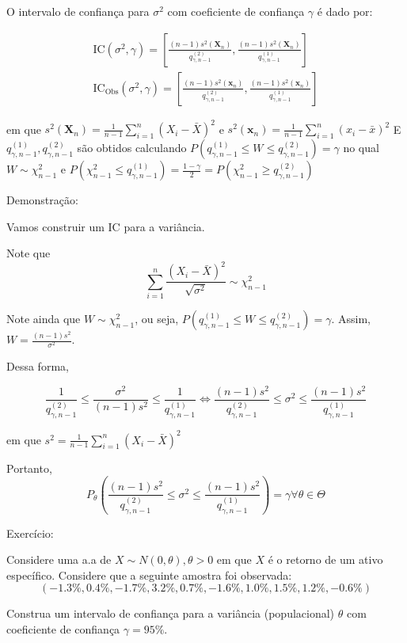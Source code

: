 \documentclass[
  letterpaper,
  DIV=11,
  numbers=noendperiod]{scrreprt}
\begin{document}
O intervalo de confiança para \(\sigma^2\) com coeficiente de confiança
\(\gamma\) é dado por:

\[
\begin{aligned}
\mathrm{IC} (\sigma^2, \gamma) = \left [\frac{(n-1)s^2(\pmb{X}_{n})}{q^{(2)}_{\gamma, n-1}},
\frac{(n-1)s^2(\pmb{X}_{n})}{q^{(1)}_{\gamma, n-1}}\right] \\
\mathrm{IC}_{\mathrm{Obs}} (\sigma^2, \gamma) = \left [\frac{(n-1)s^2(\pmb{x}_{n})}{q^{(2)}_{\gamma, n-1}},
\frac{(n-1)s^2(\pmb{x}_{n})}{q^{(1)}_{\gamma, n-1}}\right]
\end{aligned}
\]

em que
\(s^2(\pmb{X}_{n}) = \frac{1}{n-1} \sum^{n}_{i=1} (X_i - \bar{X})^2\) e
\(s^2(\pmb{x}_{n}) =
\frac{1}{n-1} \sum^{n}_{i=1} (x_i - \bar{x})^2\) E
\(q^{(1)}_{\gamma, n-1}, q^{(2)}_{\gamma, n-1}\) são obtidos calculando
\(P(q^{(1)}_{\gamma, n-1} \leq W \leq q^{(2)}_{\gamma, n-1}) = \gamma\)
no qual \(W\sim \chi^{2}_{n-1}\) e
\(P(\chi^2_{n-1} \leq q^{(1)}_{\gamma, n-1}) = \frac{1-\gamma}{2} = P( \chi^2_{n-1} \geq q^{(2)}_{\gamma,n-1})\)

Demonstração:

Vamos construir um IC para a variância.

Note que
\[\sum\limits^{n}_{i=1}\frac{(X_{i} - \bar{X})^2}{\sqrt{\sigma^2}} \sim \chi^2_{n-1}\]

Note ainda que \(W \sim \chi^{2}_{n-1}\), ou seja,
\(P(q^{(1)}_{\gamma, n-1} \leq W \leq q^{(2)}_{\gamma, n-1}) = \gamma\).
Assim, \(W = \frac{(n-1)s^2}{\sigma^2}\).

Dessa forma,

\[
\frac{1}{q^{(2)}_{\gamma, n-1}} \leq \frac{\sigma^2}{(n-1) s^2} \leq \frac{1}{q^{(1)}_{\gamma, n-1}} \Leftrightarrow
\frac{(n-1)s^2}{q^{(2)}_{\gamma, n-1}} \leq \sigma^2 \leq \frac{(n-1)s^2}{q^{(1)}_{\gamma, n-1}}
\]

em que \(s^2 = \frac{1}{n-1} \sum^{n}_{i=1} (X_i - \bar{X})^2\)

Portanto,
\[ P_{\theta}\left (\frac{(n-1)s^2}{q^{(2)}_{\gamma, n-1}} \leq \sigma^2 \leq \frac{(n-1)s^2}{q^{(1)}_{\gamma, n-1}}\right)
= \gamma \forall \theta \in \Theta\]

Exercício:

Considere uma a.a de \(X\sim N(0, \theta), \theta > 0\) em que \(X\) é o
retorno de um ativo específico. Considere que a seguinte amostra foi
observada: \[
(-1.3\%, 0.4\%, -1.7\%, 3.2\%, 0.7\%, -1.6\%, 1.0\%, 1.5\%, 1.2\%, -0.6\%)
\]

Construa um intervalo de confiança para a variância (populacional)
\(\theta\) com coeficiente de confiança \(\gamma = 95\%\).
\end{document}
